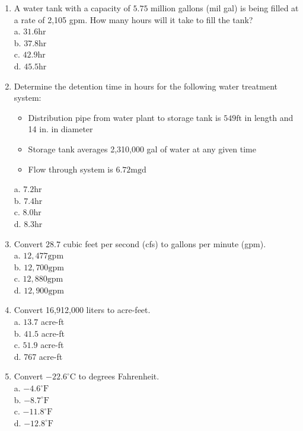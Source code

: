 \documentclass[10pt]{article}
\begin{document}
\begin{enumerate}
  \item A water tank with a capacity of $5.75$ million gallons (mil gal) is being filled at a rate of 2,105 gpm. How many hours will it take to fill the tank?\\
a. $31.6 \mathrm{hr}$\\
b. $37.8 \mathrm{hr}$\\
c. $42.9 \mathrm{hr}$\\
d. $45.5 \mathrm{hr}$

  \item Determine the detention time in hours for the following water treatment system:
\begin{itemize}
  \item Distribution pipe from water plant to storage tank is $549 \mathrm{ft}$ in length and 14 in. in diameter

  \item Storage tank averages 2,310,000 gal of water at any given time

  \item Flow through system is $6.72 \mathrm{mgd}$\\
  
  \end{itemize}
a. $7.2 \mathrm{hr}$\\
b. $7.4 \mathrm{hr}$\\
c. $8.0 \mathrm{hr}$\\
d. $8.3 \mathrm{hr}$

  \item Convert $28.7$ cubic feet per second (cfs) to gallons per minute (gpm).\\
a. $12,477 \mathrm{gpm}$\\
b. $12,700 \mathrm{gpm}$\\
c. $12,880 \mathrm{gpm}$\\
d. $12,900 \mathrm{gpm}$

  \item Convert 16,912,000 liters to acre-feet.\\
a. $13.7$ acre-ft\\
b. $41.5$ acre-ft\\
c. $51.9$ acre-ft\\
d. 767 acre-ft

  \item Convert $-22.6^{\circ} \mathrm{C}$ to degrees Fahrenheit.\\
a. $-4.6^{\circ} \mathrm{F}$\\
b. $-8.7^{\circ} \mathrm{F}$\\
c. $-11.8^{\circ} \mathrm{F}$\\
d. $-12.8^{\circ} \mathrm{F}$


\end{enumerate}
\end{document}
